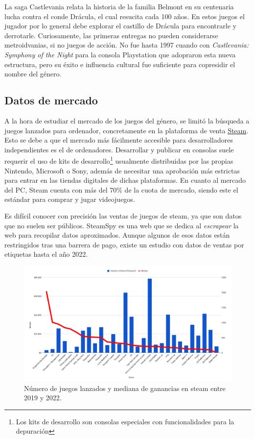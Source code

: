 La saga Castlevania relata la historia de la familia Belmont en su centenaria lucha contra el conde Drácula, el cual resucita cada 100 años. En estos juegos el jugador por lo general debe explorar el castillo de Drácula para encontrarle y derrotarle. Curiosamente, las primeras entregas no pueden considerarse metroidvanias, si no juegos de acción. No fue hasta 1997 cuando con \textit{Castlevania: Symphony of the Night} para la consola Playstation que adopraron esta nueva estructura, pero su éxito e influencia cultural fue suficiente para copresidir el nombre del género.

\subsection{Datos de mercado}

A la hora de estudiar el mercado de los juegos del género, se limitó la búsqueda a juegos lanzados para ordenador, concretamente en la plataforma de venta \href{https://store.steampowered.com/?l=spanish}{Steam}. Esto se debe a que el mercado más fácilmente accesible para desarrolladores independientes es el de ordenadores. Desarrollar y publicar en consolas suele requerir el uso de kits de desarrollo\footnote{Los kits de desarrollo son consolas especiales con funcionalidades para la depuración} usualmente distribuidas por las propias Nintendo, Microsoft o Sony, además de necesitar una aprobación más estrictas para entrar en las tiendas digitales de dichas plataformas. En cuanto al mercado del PC, Steam cuenta con más del 70\% de la cuota de mercado\cite{pc-market-share}, siendo este el estándar para comprar y jugar videojuegos.

Es difícil conocer con precisión las ventas de juegos de steam, ya que son datos que no suelen ser públicos. SteamSpy\cite{steamspy} es una web que se dedica al \textit{escrapear} la web para recopilar datos aproximados. Aunque algunos de esos datos están restringidos tras una barrera de pago, existe un estudio\cite{steamgames-genre} con datos de ventas por etiquetas hasta el año 2022.

\begin{figure}[h]
    \centering
    \includegraphics[scale=0.28]{img/genres-chart.png}
    \caption[Datos de venta por género en steam]{Número de juegos lanzados y mediana de ganancias en steam entre 2019 y 2022.}
    \label{fig:steamgenreschart}
\end{figure}

